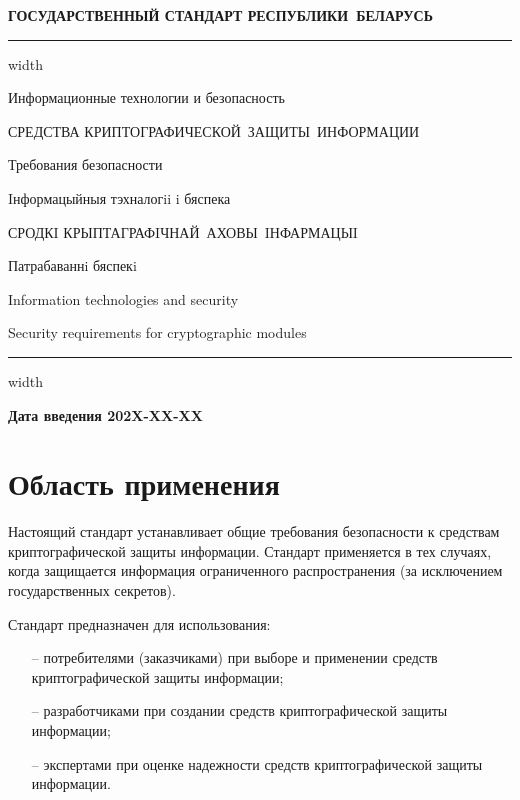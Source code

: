 \newpage
\setcounter{page}{1}
\pagestyle{headings}

\begin{center}
{\bfseries
ГОСУДАРСТВЕННЫЙ СТАНДАРТ РЕСПУБЛИКИ~БЕЛАРУСЬ
\vskip 2pt
\hrule width\textwidth

\vskip 9pt

Информационные технологии и безопасность

СРЕДСТВА КРИПТОГРАФИЧЕСКОЙ~ЗАЩИТЫ~ИНФОРМАЦИИ

Требования безопасности

\vskip 9pt

Iнформацыйныя тэхналогii i бяспека

СРОДКI КРЫПТАГРАФIЧНАЙ~АХОВЫ~IНФАРМАЦЫI

Патрабаваннi бяспекi
}

\vskip 9pt

Information technologies and security

Security requirements for cryptographic modules

\vskip 4pt                
\hrule width \textwidth
\end{center}

\mbox{}\hfill{\bfseries Дата введения 202X-XX-XX}

\chapter{Область применения}\label{SCOPE}

Настоящий стандарт устанавливает общие требования безопасности к средствам
криптографической защиты информации. Стандарт применяется в тех 
случаях, когда защищается информация ограниченного распространения (за 
исключением государственных секретов).

Стандарт предназначен для использования:
\begin{itemize}
\item[--]
потребителями (заказчиками) при выборе и применении средств криптографической
защиты информации;

\item[--]
разработчиками при создании средств криптографической защиты информации;

\item[--]
экспертами при оценке надежности средств криптографической защиты 
информации. 
\end{itemize}


